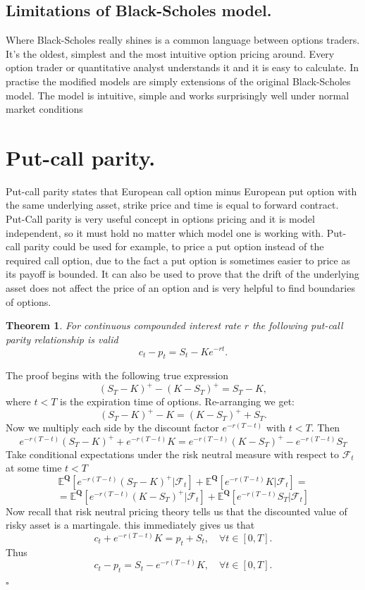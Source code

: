 \documentclass{book}
\newtheorem{theorem}{Theorem}[section]
\newenvironment{proof}
{{\bf Proof. }}{\begin{flushright}$\square$\end{flushright}}
\begin{document}
\subsection{Limitations of Black-Scholes model.}
Where Black-Scholes really shines is a common language between options traders. It's the oldest, simplest and the most intuitive option pricing around. Every option trader or quantitative analyst understands it and it is easy to calculate. In practise the modified models are simply extensions of the original Black-Scholes model. The model is intuitive, simple and works surprisingly well under normal market conditions
\section{Put-call parity.}
Put-call parity states that European call option minus European put option with the same underlying asset, strike price and time is equal to forward contract.\\
Put-Call parity is very useful concept in options pricing and it is model independent, so it must hold no matter which model one is working with. Put-call parity could be used for example, to price a put option instead of the required call option, due to the fact a put option is sometimes easier to price as its payoff is bounded. It can also be used to prove that the drift of the underlying asset does not affect the price of an option and is very helpful to find boundaries of options.  
\begin{theorem}
For continuous compounded interest rate $r$ the following put-call parity relationship is valid
$$
c_{t}-p_{t}=S_{t}-Ke^{-rt}.
$$
\end{theorem}
\begin{proof}
The proof begins with the following true expression
\[(S_{T}-K)^{+}-(K-S_{T})^{+}=S_{T}-K,\]
where $t<T$ is the expiration time of options. Re-arranging we get:
\[(S_{T}-K)^{+}-K=(K-S_{T})^{+}+S_{T}.\] 
Now we multiply each side by the discount factor $e^{-r(T-t)}$ with $t<T$. Then
$$
e^{-r(T-t)}(S_{T}-K)^{+}+e^{-r(T-t)}K=e^{-r(T-t)}(K-S_{T})^{+}-e^{-r(T-t)}S_{T}
$$
Take conditional expectations under the risk neutral measure with respect to $\mathcal{F}_{t}$ at some time $t<T$
$$
\mathbb{E}^{\mathbf{Q}}[e^{-r(T-t)}(S_{T}-K)^{+}|\mathcal{F}_{t}]+\mathbb{E}^{\mathbf{Q}}[e^{-r(T-t)}K|\mathcal{F}_{t}]=
$$
$$
=\mathbb{E}^{\mathbf{Q}}[e^{-r(T-t)}(K-S_{T})^{+}|\mathcal{F}_{t}]+\mathbb{E}^{\mathbf{Q}}[e^{-r(T-t)}S_{T}|\mathcal{F}_{t}]
$$
Now recall that risk neutral pricing theory tells us that the discounted value of risky asset is a martingale. this immediately gives us that 
$$
c_{t}+e^{-r(T-t)}K=p_{t}+S_{t},\quad \forall t \in[0,T].
$$
Thus
$$
c_{t}-p_{t}=S_{t}-e^{-r(T-t)}K,\quad \forall t \in[0,T].
$$
\end{proof}
\end{document}
